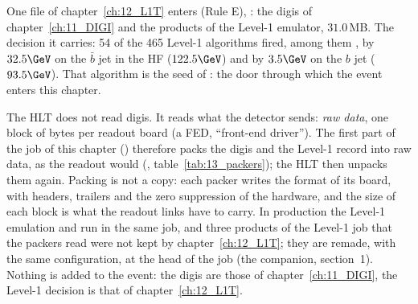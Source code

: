 One file of chapter~\ref{ch:12_L1T} enters (Rule E), : the digis of
chapter~\ref{ch:11_DIGI} and the products of the Level-1 emulator, $31.0\,$MB. The decision it carries: 54 of the 465
Level-1 algorithms fired, among them , by $32.5\GeV$ on the $\bar b$ jet in the HF ($122.5\GeV$)
and by $3.5\GeV$ on the $b$ jet ($93.5\GeV$). That algorithm is the seed of : the door
through which the event enters this chapter.

The HLT does not read digis. It reads what the detector sends: \emph{raw data}, one block of bytes per readout board
(a FED, ``front-end driver''). The first part of the job of this chapter ()
therefore packs the digis and the Level-1 record into raw data, as the readout would (,
table~\ref{tab:13_packers}); the HLT then unpacks them again. Packing is not a copy: each packer writes the format of
its board, with headers, trailers and the zero suppression of the hardware, and the size of each block is what the
readout links have to carry. In production the Level-1 emulation and  run in the same job, and three products
of the Level-1 job that the packers read were not kept by chapter~\ref{ch:12_L1T}; they are remade, with the same
configuration, at the head of the job (the companion, section~1). Nothing is added to the event: the digis are those
of chapter~\ref{ch:11_DIGI}, the Level-1 decision is that of chapter~\ref{ch:12_L1T}.

